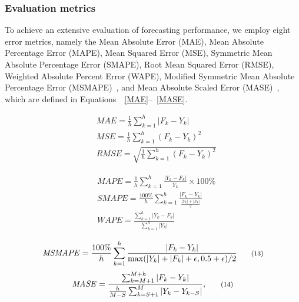 \documentclass[sigconf, nonacm, pdfa]{acmart}
\begin{document}
\subsubsection{Evaluation metrics}

To achieve an extensive evaluation of forecasting performance, we employ eight error metrics, namely the Mean Absolute Error (MAE), Mean Absolute Percentage Error (MAPE), Mean Squared Error (MSE), Symmetric Mean Absolute Percentage Error (SMAPE), Root Mean Squared Error (RMSE), Weighted Absolute Percent Error (WAPE), Modified Symmetric Mean Absolute Percentage Error (MSMAPE)~\cite{msmape}, and Mean Absolute Scaled Error (MASE)~\cite{hyndman2006another}, which are defined in Equations~~\ref{MAE}--~\ref{MASE}. 



\begin{minipage}{.42\linewidth}
\footnotesize
\begin{align}
    &\mathit{MAE} = \frac{1}{h}\sum_{k=1}^{h}|F_k-Y_k| \label{MAE} \tag{7}\\
    &\mathit{MSE} = \frac{1}{h}\sum_{k=1}^{h}(F_k - Y_k)^2\tag{9}\\
    &\mathit{RMSE} = \sqrt{\frac{1}{h}\sum_{k=1}^{h}(F_k-Y_k)^2}\tag{11}
\end{align}
\end{minipage}%
\begin{minipage}{.54\linewidth}
\footnotesize
\begin{align}
&\mathit{MAPE} = \frac{1}{h}\sum_{k=1}^{h}\frac{|Y_k - F_k|}{Y_k}\times 100\% \tag{8}\\
    &\mathit{SMAPE} = \frac{100\%}{h}\sum_{k=1}^{h}\frac{|F_k-Y_k|}{\frac{|Y_k|+|F_k|}{2}}\tag{10}\\
    &\mathit{WAPE} = \frac{\sum_{k=1}^{h}|Y_k - F_k|}{\sum_{k=1}^{h}|Y_k|}\tag{12}
\end{align}
\end{minipage}

\begin{equation}
\footnotesize
\mathit{MSMAPE} = \frac{100\%}{h}\sum_{k=1}^{h}\frac{|F_k-Y_k|}{\max(|Y_k|+|F_k|+\epsilon,0.5+\epsilon)/2} \label{MSMAPE}\tag{13}
\end{equation}
\begin{equation}
\label{MASE}
\footnotesize
\mathit{MASE} = \frac{\sum_{k=M+1}^{M+h}|F_k-Y_k|}{\frac{h}{M-S}\sum_{k=S+1}^{M}|Y_k-Y_{k-S}|},\tag{14}
\end{equation}
\end{document}
